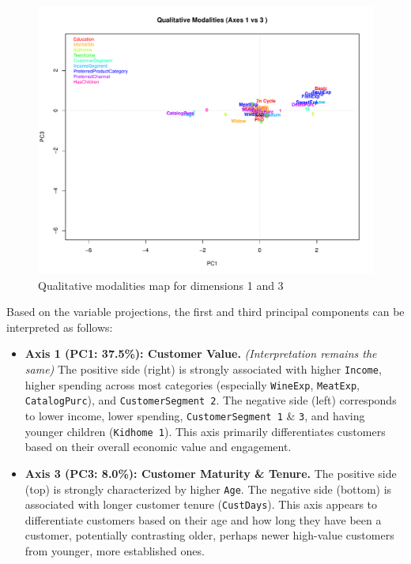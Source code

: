 \begin{figure}[H]
    \centering
    \includegraphics[width=0.9\linewidth]{Imatges/qualitative_modalities_map_1_3.pdf}
    \caption{Qualitative modalities map for dimensions 1 and 3}
    \label{fig:qualitative_map_1_3}
\end{figure}


Based on the variable projections, the first and third principal components can be interpreted as follows:

\begin{itemize}
    \item \textbf{Axis 1 (PC1: 37.5\%): Customer Value.} \textit{(Interpretation remains the same)} The positive side (right) is strongly associated with higher \texttt{Income}, higher spending across most categories (especially \texttt{WineExp}, \texttt{MeatExp}, \texttt{CatalogPurc}), and \texttt{CustomerSegment 2}. The negative side (left) corresponds to lower income, lower spending, \texttt{CustomerSegment 1} \& \texttt{3}, and having younger children (\texttt{Kidhome 1}). This axis primarily differentiates customers based on their overall economic value and engagement.
    
    \item \textbf{Axis 3 (PC3: 8.0\%): Customer Maturity \& Tenure.} The positive side (top) is strongly characterized by higher \texttt{Age}. The negative side (bottom) is associated with longer customer tenure (\texttt{CustDays}). This axis appears to differentiate customers based on their age and how long they have been a customer, potentially contrasting older, perhaps newer high-value customers from younger, more established ones.
\end{itemize}
